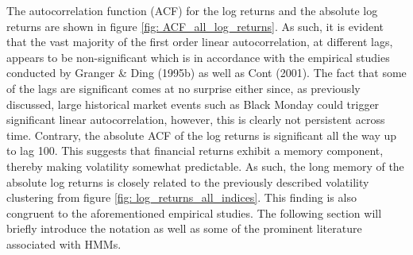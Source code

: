 The autocorrelation function (ACF) for the log returns and the absolute log returns are shown in figure \ref{fig: ACF_all_log_returns}. As such, it is evident that the vast majority of the first order linear autocorrelation, at different lags, appears to be non-significant which is in accordance with the empirical studies conducted by Granger \& Ding (1995b) as well as Cont (2001). The fact that some of the lags are significant comes at no surprise either since, as previously discussed, large historical market events such as Black Monday could trigger significant linear autocorrelation, however, this is clearly not persistent across time. Contrary, the absolute ACF of the log returns is significant all the way up to lag 100. This suggests that financial returns exhibit a memory component, thereby making volatility somewhat predictable. As such, the long memory of the absolute log returns is closely related to the previously described volatility clustering from figure \ref{fig: log_returns_all_indices}. This finding is also congruent to the aforementioned empirical studies. The following section will briefly introduce the notation as well as some of the prominent literature associated with HMMs.
